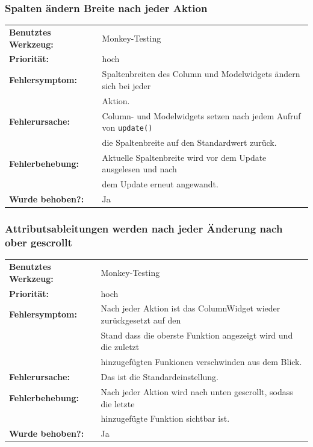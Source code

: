 \documentclass{article}
\begin{document}
\subsubsection*{Spalten ändern Breite nach jeder Aktion}
\begin{tabular}{ll}
    \textbf{Benutztes Werkzeug:} & Monkey-Testing\\
    \textbf{Priorität:} & hoch\\
    \textbf{Fehlersymptom:} & Spaltenbreiten des Column und Modelwidgets ändern sich bei jeder\\
    & Aktion.\\
    \textbf{Fehlerursache:} & Column- und Modelwidgets setzen nach jedem Aufruf von \texttt{update()}\\
    & die Spaltenbreite auf den Standardwert zurück.\\
    \textbf{Fehlerbehebung:} & Aktuelle Spaltenbreite wird vor dem Update ausgelesen und nach\\
    & dem Update erneut angewandt.\\
    \textbf{Wurde behoben?:} & Ja\\
\end{tabular}

\subsubsection*{Attributsableitungen werden nach jeder Änderung nach ober gescrollt}
\begin{tabular}{ll}
    \textbf{Benutztes Werkzeug:} & Monkey-Testing\\
    \textbf{Priorität:} & hoch\\
    \textbf{Fehlersymptom:} & Nach jeder Aktion ist das ColumnWidget wieder zurückgesetzt auf den\\
    &Stand dass die oberste Funktion angezeigt wird und die zuletzt \\
    &hinzugefügten Funkionen verschwinden aus dem Blick.\\
    \textbf{Fehlerursache:} & Das ist die Standardeinstellung.\\
    \textbf{Fehlerbehebung:} & Nach jeder Aktion wird nach unten gescrollt, sodass die letzte\\
    & hinzugefügte Funktion sichtbar ist.\\
    \textbf{Wurde behoben?:} & Ja\\
\end{tabular}
\end{document}
